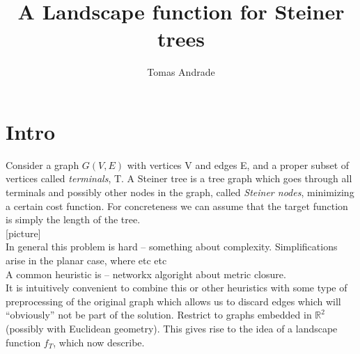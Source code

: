 \documentclass[12pt]{article}
\begin{document}
\title{A Landscape function for Steiner trees}
\author{Tomas Andrade}

\maketitle


\tableofcontents

\section{Intro}

Consider a graph $G(V, E)$ with vertices V and edges E, and a proper subset of vertices called {\it terminals}, T. A Steiner tree is a tree graph which goes through all terminals and possibly other nodes in the graph, called {\it Steiner nodes}, minimizing a certain cost function.
For concreteness we can assume that the target function is simply the length of the tree.  \\

[picture] \\

In general this problem is hard -- something about complexity. Simplifications arise in the planar case, where etc etc \\

A common heuristic is -- networkx algoright about metric closure. \\

It is intuitively convenient to combine this or other heuristics with some type of preprocessing of the original graph which allows us to discard edges which will ``obviously'' not be part of the solution. Restrict to graphs embedded in $\mathbb{R}^2$ (possibly with Euclidean 
geometry). This gives rise to the idea of a landscape function $f_T$, which now describe. 
\end{document}
